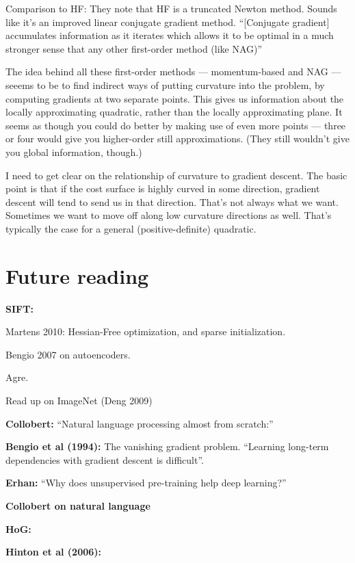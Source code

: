\documentclass[12pt]{report}
\begin{document}
Comparison to HF: They note that HF is a truncated Newton method.
Sounds like it's an improved linear conjugate gradient
method. ``[Conjugate gradient] accumulates information as it iterates
which allows it to be optimal in a much stronger sense that any other
first-order method (like NAG)''

The idea behind all these first-order methods --- momentum-based and
NAG --- seeems to be to find indirect ways of putting curvature into
the problem, by computing gradients at two separate points.  This
gives us information about the locally approximating quadratic, rather
than the locally approximating plane.  It seems as though you could do
better by making use of even more points --- three or four would give
you higher-order still approximations.  (They still wouldn't give you
global information, though.)

I need to get clear on the relationship of curvature to gradient
descent.  The basic point is that if the cost surface is highly curved
in some direction, gradient descent will tend to send us in that
direction.  That's not always what we want.  Sometimes we want to move
off along low curvature directions as well.  That's typically the case
for a general (positive-definite) quadratic.








\section{Future reading}

\textbf{SIFT:}

Martens 2010: Hessian-Free optimization, and sparse initialization.

Bengio 2007 on autoencoders.

Agre.

Read up on ImageNet (Deng 2009)

\textbf{Collobert:} ``Natural language processing almost from scratch:''

\textbf{Bengio et al (1994):} The vanishing gradient problem.
``Learning long-term dependencies with gradient descent is
difficult''.

\textbf{Erhan:} ``Why does unsupervised pre-training help deep learning?''

\textbf{Collobert on natural language}

\textbf{HoG:}

\textbf{Hinton et al (2006):}
\end{document}
